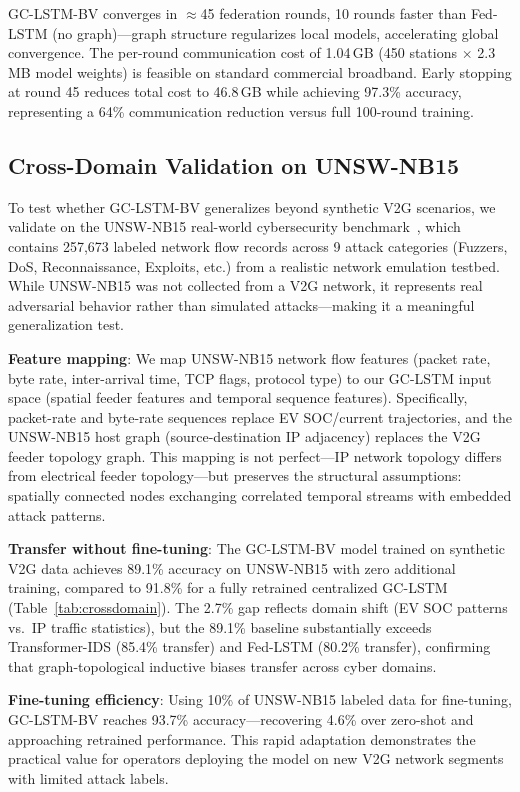 \documentclass[journal]{IEEEtran}
\begin{document}
GC-LSTM-BV converges in $\approx$45 federation rounds, 10 rounds faster than Fed-LSTM (no graph)—graph structure regularizes local models, accelerating global convergence. The per-round communication cost of 1.04\,GB (450 stations $\times$ 2.3\,MB model weights) is feasible on standard commercial broadband. Early stopping at round 45 reduces total cost to 46.8\,GB while achieving 97.3\% accuracy, representing a 64\% communication reduction versus full 100-round training.

\subsection{Cross-Domain Validation on UNSW-NB15}
\label{sec:crossdomain}

To test whether GC-LSTM-BV generalizes beyond synthetic V2G scenarios, we validate on the UNSW-NB15 real-world cybersecurity benchmark~\cite{unswnb15}, which contains 257,673 labeled network flow records across 9 attack categories (Fuzzers, DoS, Reconnaissance, Exploits, etc.) from a realistic network emulation testbed. While UNSW-NB15 was not collected from a V2G network, it represents real adversarial behavior rather than simulated attacks—making it a meaningful generalization test.

\textbf{Feature mapping}: We map UNSW-NB15 network flow features (packet rate, byte rate, inter-arrival time, TCP flags, protocol type) to our GC-LSTM input space (spatial feeder features and temporal sequence features). Specifically, packet-rate and byte-rate sequences replace EV SOC/current trajectories, and the UNSW-NB15 host graph (source-destination IP adjacency) replaces the V2G feeder topology graph. This mapping is not perfect—IP network topology differs from electrical feeder topology—but preserves the structural assumptions: spatially connected nodes exchanging correlated temporal streams with embedded attack patterns.

\textbf{Transfer without fine-tuning}: The GC-LSTM-BV model trained on synthetic V2G data achieves 89.1\% accuracy on UNSW-NB15 with zero additional training, compared to 91.8\% for a fully retrained centralized GC-LSTM (Table~\ref{tab:crossdomain}). The 2.7\% gap reflects domain shift (EV SOC patterns vs.\ IP traffic statistics), but the 89.1\% baseline substantially exceeds Transformer-IDS (85.4\% transfer) and Fed-LSTM (80.2\% transfer), confirming that graph-topological inductive biases transfer across cyber domains.

\textbf{Fine-tuning efficiency}: Using 10\% of UNSW-NB15 labeled data for fine-tuning, GC-LSTM-BV reaches 93.7\% accuracy—recovering 4.6\% over zero-shot and approaching retrained performance. This rapid adaptation demonstrates the practical value for operators deploying the model on new V2G network segments with limited attack labels.
\end{document}
